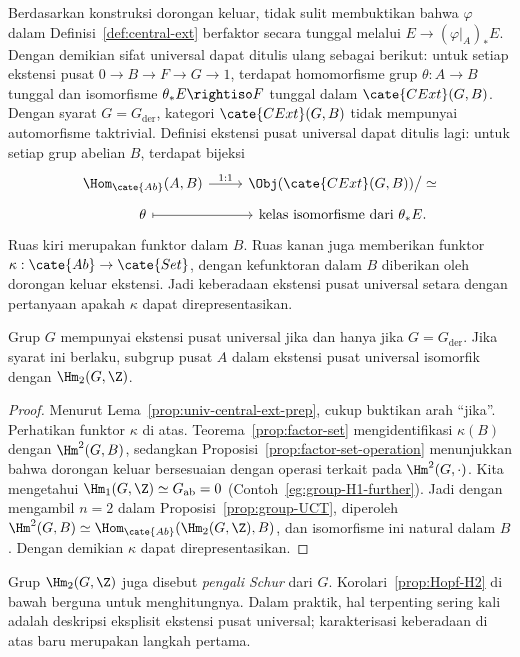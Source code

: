 Berdasarkan konstruksi dorongan keluar, tidak sulit membuktikan bahwa
$\varphi$ dalam Definisi~\ref{def:central-ext} berfaktor secara tunggal
melalui $E\to(\varphi|_A)_*E$. Dengan demikian sifat universal dapat ditulis
ulang sebagai berikut: untuk setiap ekstensi pusat
$0\to B\to F\to G\to1$, terdapat homomorfisme grup $\theta:A\to B$ tunggal
dan isomorfisme $\theta_*E\rightiso F$ tunggal dalam $\cate{CExt}(G,B)$.
Dengan syarat $G=G_{\mathrm{der}}$, kategori $\cate{CExt}(G,B)$ tidak
mempunyai automorfisme taktrivial. Definisi ekstensi pusat universal dapat
ditulis lagi: untuk setiap grup abelian $B$, terdapat bijeksi
\[\begin{tikzcd}[row sep=tiny]
	\Hom_{\cate{Ab}}(A,B) \arrow[r,"1:1"] &
	\Obj(\cate{CExt}(G,B))\big/\simeq \\
	\theta \arrow[mapsto,r] & \text{kelas isomorfisme dari }\theta_*E.
\end{tikzcd}\]
Ruas kiri merupakan funktor dalam $B$. Ruas kanan juga memberikan funktor
$\kappa:\cate{Ab}\to\cate{Set}$, dengan kefunktoran dalam $B$ diberikan oleh
dorongan keluar ekstensi. Jadi keberadaan ekstensi pusat universal setara
dengan pertanyaan apakah $\kappa$ dapat direpresentasikan.

\begin{theorem}
	Grup $G$ mempunyai ekstensi pusat universal jika dan hanya jika
	$G=G_{\mathrm{der}}$. Jika syarat ini berlaku, subgrup pusat $A$ dalam
	ekstensi pusat universal isomorfik dengan $\Hm_2(G,\Z)$.
\end{theorem}
\begin{proof}
	Menurut Lema~\ref{prop:univ-central-ext-prep}, cukup buktikan arah
	``jika''. Perhatikan funktor $\kappa$ di atas. Teorema~\ref{prop:factor-set}
	mengidentifikasi $\kappa(B)$ dengan $\Hm^2(G,B)$, sedangkan
	Proposisi~\ref{prop:factor-set-operation} menunjukkan bahwa dorongan keluar
	bersesuaian dengan operasi terkait pada $\Hm^2(G,\cdot)$. Kita mengetahui
	$\Hm_1(G,\Z)\simeq G_{\mathrm{ab}}=0$
	(Contoh~\ref{eg:group-H1-further}). Jadi dengan mengambil $n=2$ dalam
	Proposisi~\ref{prop:group-UCT}, diperoleh
	$\Hm^2(G,B)\simeq\Hom_{\cate{Ab}}(\Hm_2(G,\Z),B)$, dan isomorfisme ini
	natural dalam $B$. Dengan demikian $\kappa$ dapat direpresentasikan.
\end{proof}

Grup $\Hm_2(G,\Z)$ juga disebut \emph{pengali Schur} dari $G$.
Korolari~\ref{prop:Hopf-H2} di bawah berguna untuk menghitungnya. Dalam praktik,
hal terpenting sering kali adalah deskripsi eksplisit ekstensi pusat universal;
karakterisasi keberadaan di atas baru merupakan langkah pertama.

